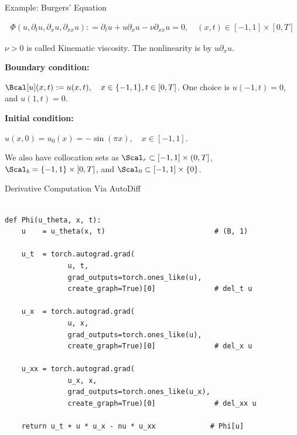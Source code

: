 \documentclass[aspectratio=169,xcolor=dvipsnames,svgnames,x11names,fleqn]{beamer}
\begin{document}
\begin{frame}{Example: Burgers' Equation}

\begin{align*}
\Phi(u, \partial_t u, \partial_x u, \partial_{xx} u): = \partial_t u  + u \partial_x u  - \nu \partial_{xx} u= 0, \quad (x, t) \in [-1 , 1] \times [0, T]
\end{align*}

\vspace{5pt}


$\nu > 0$ is called Kinematic viscosity. The nonlinearity is by $ u \partial_x u$.

\vspace{10pt}


\textbf{Boundary condition:}

$\Bcal[u](x, t):= u(x,t) , \quad x\in\{-1,1\}, t \in [0, T]$. One choice is $u(-1, t) = 0$, and $u(1, t) = 0$.

\vspace{10pt}


\textbf{Initial condition:}

$u(x,0)  = u_0(x) = -\sin(\pi x), \quad x\in [-1,1]$.

\vspace{10pt}

We also have collocation sets as $\Scal_r \subset [-1,1] \times (0, T]$, $\Scal_b = \{-1, 1\} \times [0, T]$, and $\Scal_0 \subset [-1,1] \times\{0\}$.

\end{frame}


\begin{frame}[fragile]{Derivative Computation Via AutoDiff}

\begin{verbatim}

def Phi(u_theta, x, t):
    u    = u_theta(x, t)                          # (B, 1)

    u_t  = torch.autograd.grad(
               u, t,
               grad_outputs=torch.ones_like(u),
               create_graph=True)[0]              # del_t u

    u_x  = torch.autograd.grad(
               u, x,
               grad_outputs=torch.ones_like(u),
               create_graph=True)[0]              # del_x u

    u_xx = torch.autograd.grad(
               u_x, x,
               grad_outputs=torch.ones_like(u_x),
               create_graph=True)[0]              # del_xx u

    return u_t + u * u_x - nu * u_xx             # Phi[u]
    
\end{verbatim}

\end{frame}
\end{document}
